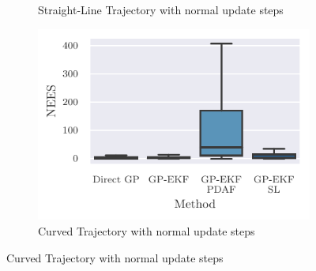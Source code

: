\begin{figure}
{\begin{subfigure}{0.6\textwidth}
            \caption{Straight-Line Trajectory with normal update steps}
        \end{subfigure}
        \begin{subfigure}{0.6\textwidth}
            \includegraphics{figures/curved_line_stats/nees.pdf}
            \caption{Curved Trajectory with normal update steps}
        \end{subfigure}
    }


\end{figure}
